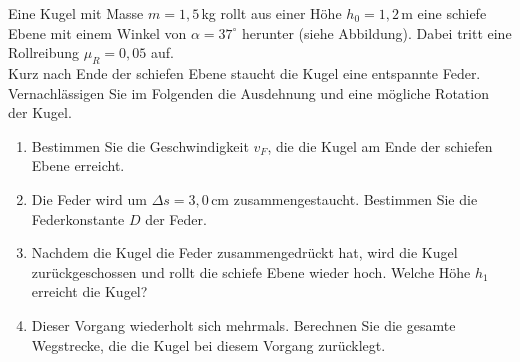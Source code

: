 \begin{ExerciseBlock}
Eine Kugel mit Masse $m = 1,5\,$kg rollt aus einer Höhe $h_0 = 1,2\,$m eine schiefe Ebene mit einem Winkel von $\alpha = 37^\circ$ herunter (siehe Abbildung). Dabei tritt eine Rollreibung $\mu_R = 0,05$ auf. \\
Kurz nach Ende der schiefen Ebene staucht die Kugel eine entspannte Feder. Vernachlässigen Sie im Folgenden die Ausdehnung und eine mögliche Rotation der Kugel.

\begin{center}
\end{center}

\begin{enumerate}
	\item Bestimmen Sie die Geschwindigkeit $v_F$, die die Kugel am Ende der schiefen Ebene erreicht.

	\item Die Feder wird um $\Delta s = 3,0\,$cm zusammengestaucht. Bestimmen Sie die Federkonstante $D$ der
Feder.

	\item Nachdem die Kugel die Feder zusammengedrückt hat, wird die Kugel zurückgeschossen und rollt die schiefe Ebene wieder hoch. Welche Höhe $h_1$ erreicht die Kugel?

	\item Dieser Vorgang wiederholt sich mehrmals. Berechnen Sie die gesamte Wegstrecke, die die Kugel bei diesem Vorgang zurücklegt.
\end{enumerate}
\end{ExerciseBlock}
